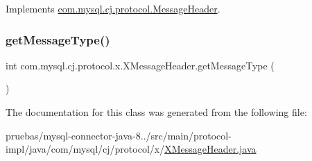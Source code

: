 Implements \mbox{\hyperlink{interfacecom_1_1mysql_1_1cj_1_1protocol_1_1_message_header_a8192e2c73dd6c3ed31e569034950f163}{com.\+mysql.\+cj.\+protocol.\+Message\+Header}}.

\mbox{\label{classcom_1_1mysql_1_1cj_1_1protocol_1_1x_1_1_x_message_header_a97ea98c4f2519880ea76fc4698e9e99d}} 
\subsubsection{\texorpdfstring{get\+Message\+Type()}{getMessageType()}}
{\footnotesize\ttfamily int com.\+mysql.\+cj.\+protocol.\+x.\+X\+Message\+Header.\+get\+Message\+Type (\begin{DoxyParamCaption}{ }\end{DoxyParamCaption})}



The documentation for this class was generated from the following file\+:\begin{DoxyCompactItemize}
\item 
pruebas/mysql-\/connector-\/java-\/8../src/main/protocol-\/impl/java/com/mysql/cj/protocol/x/\mbox{\hyperlink{_x_message_header_8java}{X\+Message\+Header.\+java}}\end{DoxyCompactItemize}
